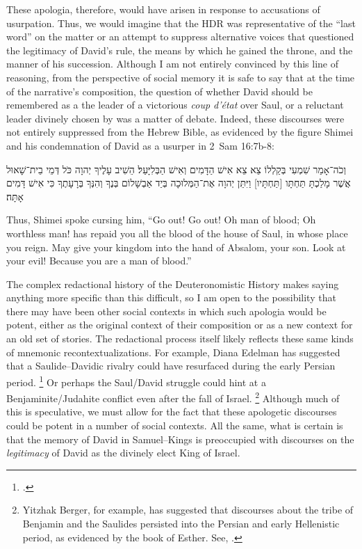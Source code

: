 These apologia, therefore, would have arisen in response to accusations of usurpation. Thus, we would imagine that the HDR was representative of the ``last word'' on the matter or an attempt to suppress alternative voices that questioned the legitimacy of David's rule, the means by which he gained the throne, and the manner of his succession. Although I am not entirely convinced by this line of reasoning, from the perspective of social memory it is safe to say that at the time of the narrative's composition, the question of whether David should be remembered as a the leader of a victorious \emph{coup d'état} over Saul, or a reluctant leader divinely chosen by \yahweh was a matter of debate. Indeed, these discourses were not entirely suppressed from the Hebrew Bible, as evidenced by the figure Shimei and his condemnation of David as a usurper in 2~Sam 16:7b-8:
\begin{hebrewtext}
    וְכֹה־אָמַר שִׁמְעִי בְּקַלְלוֹ צֵא צֵא אִישׁ הַדָּמִים וְאִישׁ הַבְּלִיָּעַל׃ 
    הֵשִׁיב עָלֶיךָ יְהוָה כֹּל דְּמֵי בֵית־שָׁאוּל אֲשֶׁר מָלַכְתָּ תַּחְתָּו [תַּחְתָּיו] וַיִּתֵּן יְהוָה אֶת־הַמְּלוּכָה בְּיַד אַבְשָׁלוֹם בְּנֶךָ וְהִנְּךָ בְּרָעָתֶךָ כִּי אִישׁ דָּמִים אָתָּה׃
\end{hebrewtext}
\begin{translation}
    Thus, Shimei spoke cursing him, ``Go out! Go out! Oh man of blood; Oh worthless man! \yahweh has repaid you all the blood of the house of Saul, in whose place you reign. May \yahweh give your kingdom into the hand of Absalom, your son. Look at your evil! Because you are a man of blood.''
\end{translation}
\noindent
The complex redactional history of the Deuteronomistic History makes saying anything more specific than this difficult, so I am open to the possibility that there may have been other social contexts in which such apologia would be potent, either as the original context of their composition or as a new context for an old set of stories. The redactional process itself likely reflects these same kinds of mnemonic recontextualizations. For example, Diana Edelman has suggested that a Saulide--Davidic rivalry could have resurfaced during the early Persian period.%
    \footnote{\Cite{edelman_dearman-graham2002}.}
Or perhaps the Saul/David struggle could hint at a Benjaminite/Judahite conflict even after the fall of Israel.%
    \footnote{Yitzhak Berger, for example, has suggested that discourses about the tribe of Benjamin and the Saulides persisted into the Persian and early Hellenistic period, as evidenced by the book of Esther. See, \cite{berger_jbl2010}.}
Although much of this is speculative, we must allow for the fact that these apologetic discourses could be potent in a number of social contexts. All the same, what is certain is that the memory of David in Samuel--Kings is preoccupied with discourses on the \emph{legitimacy} of David as the divinely elect King of Israel. 


